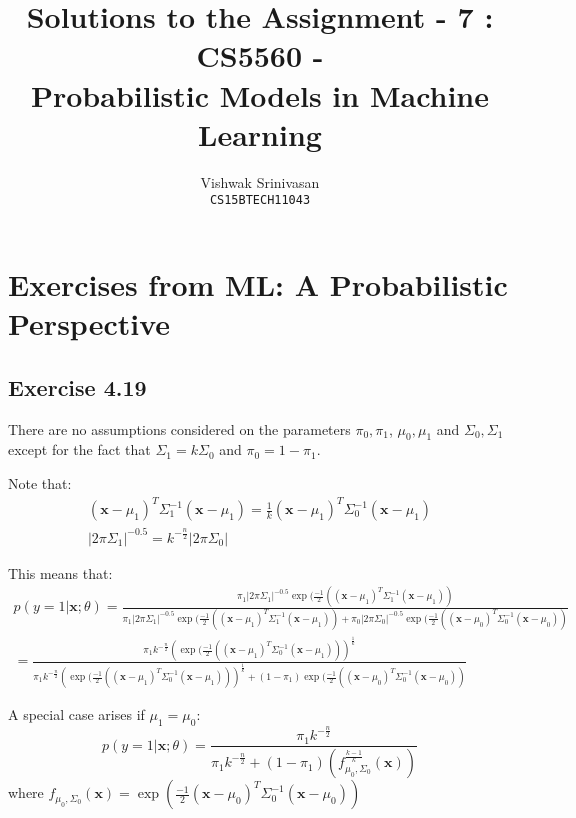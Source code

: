 \documentclass{article}
\title{Solutions to the Assignment - 7 : CS5560 - \\
Probabilistic Models in Machine Learning}
\author{Vishwak Srinivasan\\
\texttt{CS15BTECH11043}}
\date{}
\newcommand{\vct}[1]{\mathbf{#1}}
\begin{document}
\maketitle

\section*{Exercises from ML: A Probabilistic Perspective}
\subsection*{Exercise 4.19}
\begin{flushleft}
There are no assumptions considered on the parameters \(\pi_{0}, \pi_{1}\), \(\mu_{0}, \mu_{1}\) and \(\Sigma_{0}, \Sigma_{1}\) except for the fact that \(\Sigma_{1} = k\Sigma_{0}\) and \(\pi_{0} = 1 - \pi_{1}\).

Note that:
\begin{gather}
(\vct{x} - \mu_{1})^{T}\Sigma_{1}^{-1}(\vct{x} - \mu_{1}) = \frac{1}{k}(\vct{x} - \mu_{1})^{T}\Sigma_{0}^{-1}(\vct{x} - \mu_{1})\\
|2\pi \Sigma_{1}|^{-0.5} = k^{-\frac{n}{2}} |2\pi \Sigma_{0}|
\end{gather}

This means that:
\begin{multline}
p(y = 1 | \vct{x}; \theta) = \frac{\pi_{1}|2\pi \Sigma_{1}|^{-0.5} \exp(\frac{-1}{2}\left((\vct{x} - \mu_{1})^{T}\Sigma_{1}^{-1}(\vct{x} - \mu_{1})\right)}{\pi_{1}|2\pi \Sigma_{1}|^{-0.5} \exp(\frac{-1}{2}\left((\vct{x} - \mu_{1})^{T}\Sigma_{1}^{-1}(\vct{x} - \mu_{1})\right) + \pi_{0}|2\pi \Sigma_{0}|^{-0.5} \exp(\frac{-1}{2}\left((\vct{x} - \mu_{0})^{T}\Sigma_{0}^{-1}(\vct{x} - \mu_{0})\right)}\\= \frac{\pi_{1}k^{-\frac{n}{2}} \left(\exp(\frac{-1}{2}\left((\vct{x} - \mu_{1})^{T}\Sigma_{0}^{-1}(\vct{x} - \mu_{1})\right)\right)^{\frac{1}{k}}}{\pi_{1}k^{-\frac{n}{2}} \left(\exp(\frac{-1}{2}\left((\vct{x} - \mu_{1})^{T}\Sigma_{0}^{-1}(\vct{x} - \mu_{1})\right)\right)^{\frac{1}{k}} + (1 - \pi_{1}) \exp(\frac{-1}{2}\left((\vct{x} - \mu_{0})^{T}\Sigma_{0}^{-1}(\vct{x} - \mu_{0})\right)}
\end{multline}

A special case arises if \(\mu_{1} = \mu_{0}\):
\begin{equation}
p(y = 1 | \vct{x} ; \theta) = \frac{\pi_{1} k^{-\frac{n}{2}}}{\pi_{1} k^{-\frac{n}{2}} + (1 - \pi_{1}) (f^{\frac{k - 1}{k}}_{\mu_{0}, \Sigma_{0}}(\vct{x}))}
\end{equation}
where \(f_{\mu_{0}, \Sigma_{0}}(\vct{x}) = \exp(\frac{-1}{2}(\vct{x} - \mu_{0})^{T}\Sigma_{0}^{-1}(\vct{x} - \mu_{0}))\)
\end{flushleft}
\end{document}
